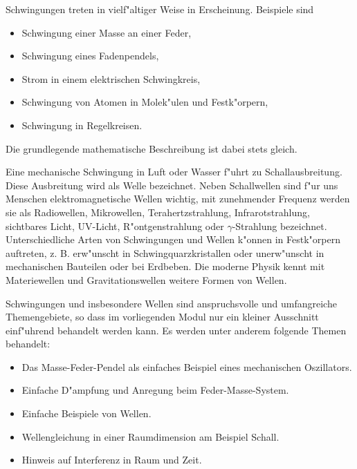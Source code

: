 \def\mse#1{\mathrm{#1}}

\begin{MSectionStart}
Schwingungen treten in vielf"altiger Weise in Erscheinung. Beispiele sind 
\begin{itemize}
  \item Schwingung einer Masse an einer Feder,
  \item Schwingung eines Fadenpendels,
  \item Strom in einem elektrischen Schwingkreis,
  \item Schwingung von Atomen in Molek"ulen und Festk"orpern,
  \item Schwingung in Regelkreisen.
\end{itemize}
Die grundlegende mathematische Beschreibung ist dabei stets gleich.

Eine mechanische Schwingung in Luft oder Wasser f"uhrt zu Schallausbreitung. Diese Ausbreitung wird als Welle bezeichnet. Neben Schallwellen sind f"ur uns Menschen elektromagnetische Wellen wichtig, mit zunehmender Frequenz werden sie als Radiowellen, Mikrowellen, Terahertzstrahlung, Infrarotstrahlung, sichtbares Licht, UV-Licht, R"ontgenstrahlung oder $\gamma$-Strahlung bezeichnet. Unterschiedliche Arten von Schwingungen und Wellen k"onnen in Festk"orpern auftreten, z. B. erw"unscht in Schwingquarzkristallen oder unerw"unscht in mechanischen Bauteilen oder bei Erdbeben. Die moderne Physik kennt mit Materiewellen und Gravitationswellen weitere Formen von Wellen.

Schwingungen und insbesondere Wellen sind anspruchsvolle und umfangreiche Themengebiete, so dass im vorliegenden Modul nur ein kleiner Ausschnitt einf"uhrend behandelt werden kann. Es werden unter anderem folgende Themen behandelt:
\begin{itemize}
  \item Das Masse-Feder-Pendel als einfaches Beispiel eines mechanischen Oszillators.
  \item Einfache D"ampfung und Anregung beim Feder-Masse-System.
  \item Einfache Beispiele von Wellen.
  \item Wellengleichung in einer Raumdimension am Beispiel Schall.
  \item Hinweis auf Interferenz in Raum und Zeit.
\end{itemize}


\end{MSectionStart}
